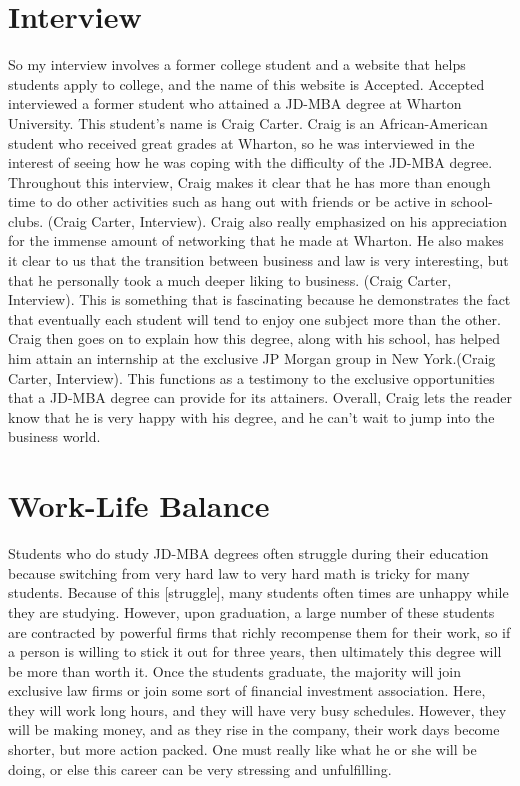 \section{Interview}
	So my interview involves a former college student and a website that helps students apply to college, and the name of this website is Accepted. Accepted interviewed a former student who attained a JD-MBA degree at Wharton University. This student’s name is Craig Carter. Craig is an African-American student who received great grades at Wharton, so he was interviewed in the interest of seeing how he was coping with the difficulty of the JD-MBA degree. Throughout this interview, Craig makes it clear that he has more than enough time to do other activities such as hang out with friends or be active in school-clubs. (Craig Carter, Interview). Craig also really emphasized on his appreciation for the immense amount of networking that he made at Wharton. He also makes it clear to us that the transition between business and law is very interesting, but that he personally took a much deeper liking to business. (Craig Carter, Interview). This is something that is fascinating because he demonstrates the fact that eventually each student will tend to enjoy one subject more than the other. Craig then goes on to explain how this degree, along with his school, has helped him attain an internship at the exclusive JP Morgan group in New York.(Craig Carter, Interview). This functions as a testimony to the exclusive opportunities that a JD-MBA degree can provide for its attainers. Overall, Craig lets the reader know that he is very happy with his degree, and he can't wait to jump into the business world. 

\section{Work-Life Balance}
	Students who do study JD-MBA degrees often struggle during their education because switching from very hard law to very hard math is tricky for many students. Because of this [struggle], many students often times are unhappy while they are studying. However, upon graduation, a large number of these students are contracted by powerful firms that richly recompense them for their work, so if a person is willing to stick it out for three years, then ultimately this degree will be more than worth it. Once the students graduate, the majority will join exclusive law firms or join some sort of financial investment association. Here, they will work long hours, and they will have very busy schedules. However, they will be making money, and as they rise in the company, their work days become shorter, but more action packed. One must really like what he or she will be doing, or else this career can be very stressing and unfulfilling. 

